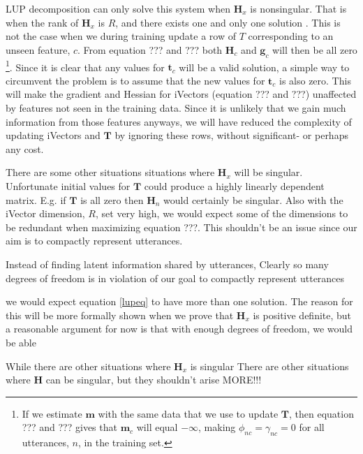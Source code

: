 LUP decomposition can only solve this system when $\mathbf{H}_x$ is nonsingular. That is when the rank of $\mathbf{H}_x$ is $R$, and there exists one and only one solution \cite[p. 54]{matte3}. This is not the case when we during training update a row of $T$ corresponding to an unseen feature, $c$. From equation ??? and ??? both $\mathbf{H}_c$ and $\mathbf{g}_c$ will then be all zero \footnote{If we estimate $\mathbf{m}$ with the same data that we use to update $\mathbf{T}$, then equation ??? and ??? gives that $\mathbf{m}_c$ will equal $-\infty$, making $\phi_{nc}=\gamma_{nc}=0$ for all utterances, $n$, in the training set.}. Since it is clear that any values for $\mathbf{t}_c$ will be a valid solution, a simple way to circumvent the problem is to assume that the new values for $\mathbf{t}_c$ is also zero. This will make the gradient and Hessian for iVectors (equation ??? and ???) unaffected by features not seen in the training data. Since it is unlikely that we gain much information  from those features anyways, we will have reduced the complexity of updating iVectors and $\mathbf{T}$ by ignoring these rows, without significant- or perhaps any cost.

There are some other situations situations where $\mathbf{H}_x$ will be singular. Unfortunate initial values for $\mathbf{T}$ could produce a highly linearly dependent matrix. E.g. if $\mathbf{T}$ is all zero then $\mathbf{H}_n$ would certainly be singular. Also with the iVector dimension, $R$, set very high, we would expect some of the dimensions to be redundant when maximizing equation ???. This shouldn't be an issue since our aim is to compactly represent utterances. 

Instead of finding latent information shared by utterances,  Clearly so many degrees of freedom is in violation of our goal to compactly represent utterances 


we would expect equation \ref{lupeq} to have more than one solution. The reason for this will be more formally shown when we prove that $\mathbf{H}_x$ is positive definite, but a reasonable argument for now is that with enough degrees of freedom, we would be able 

While there are other situations where $\mathbf{H}_x$ is singular
There are other situations where $\mathbf{H}$ can be singular, but they shouldn't arise MORE!!!


